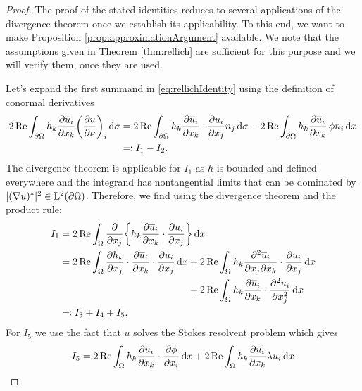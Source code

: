 \begin{proof}
  The proof of the stated identities reduces to several applications of the divergence theorem once we establish its applicability.
  To this end, we want to make Proposition \ref{prop:approximationArgument} available. We note that the assumptions given in Theorem \ref{thm:rellich} are sufficient for this purpose and we will verify them, once they are used.

  Let's expand the first summand in \eqref{eq:rellichIdentity} using the definition of conormal derivatives
  \begin{align*}
    2\operatorname{Re} \int_{\partial\Omega} h_k \frac{\partial \overline u_i}{\partial x_k} \bigg( \frac{\partial u}{\partial \nu} \bigg)_i \, {\operatorname{d}\!{\sigma}}
    &= 2 \operatorname{Re} \int_{\partial\Omega} h_k \frac{\partial \overline u_i}{\partial x_k} \cdot \frac{\partial u_i}{\partial x_j}  n_j \, {\operatorname{d}\!{\sigma}}  - 2\operatorname{Re} \int_{\partial\Omega} h_k \frac{\partial \overline u_i}{\partial x_k} \, \phi n_i \, {\operatorname{d}\!{x}} \\
    &\eqqcolon I_1 - I_2.
  \end{align*}
  The divergence theorem is applicable for $I_1$ as $h$ is bounded and defined everywhere and the integrand has nontangential limits that can be dominated by $|(\nabla u)^*|^2 \in \mathrm{L}^2(\partial\Omega)$.
  Therefore, we find using the divergence theorem and the product rule:
  \begin{align*}
    I_1
    &= 2\Ret \int_\Omega \frac{\partial}{\partial x_j} \bigg\{ h_k \frac{\partial \overline u_i}{\partial x_k} \cdot \frac{\partial u_i}{\partial x_j} \bigg\} \d x \\
    &= 2\Ret \int_\Omega \frac{\partial h_k}{\partial x_j} \cdot \frac{\partial \overline u_i}{\partial x_k} \cdot \frac{\partial u_i}{\partial x_j} \d x 
    + 2\Ret \int_{\Omega} h_k \frac{\partial^2 \overline u_i}{\partial x_j \partial x_k} \cdot \frac{\partial u_i}{\partial x_j} \d x  \\
    &\hphantom{= 2\Ret \int_\Omega \frac{\partial h_k}{\partial x_j} \cdot \frac{\partial \overline u_i}{\partial x_k} \cdot \frac{\partial u_i}{\partial x_j} \d x } \;
    + 2 \Ret \int_\Omega h_k \frac{\partial \overline u_i}{\partial x_k} \cdot \frac{\partial^2 u_i}{\partial x_j^2} \d x \\
    &\eqqcolon I_3 + I_4 + I_5.
  \end{align*}
  For $I_5$ we use the fact that $u$ solves the Stokes resolvent problem which gives
  \begin{align*}
     I_5 
     &= 2 \Ret \int_\Omega h_k \frac{\partial \overline u_i}{\partial x_k}\cdot  \frac{\partial \phi}{\partial x_i} \d x + 2\Ret \int_\Omega h_k \frac{\partial\overline u_i}{\partial x_k} \lambda u_i \d x \\

\end{align*}
\end{proof}
